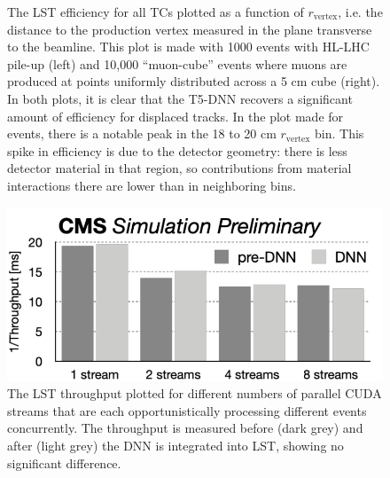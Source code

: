 \begin{figure}[!htb]
    \centering
    \qquad
    \caption{
        The LST efficiency for all TCs plotted as a function of $r_\text{vertex}$, i.e. the distance to the production vertex measured in the plane transverse to the beamline.
        This plot is made with 1000 \ttbar events with HL-LHC pile-up (left) and 10,000 ``muon-cube'' events where muons are produced at points uniformly distributed across a 5 cm cube (right).
        In both plots, it is clear that the T5-DNN recovers a significant amount of efficiency for displaced tracks.
        In the plot made for \ttbar events, there is a notable peak in the 18 to 20 cm $r_\text{vertex}$ bin.
        This spike in efficiency is due to the detector geometry: there is less detector material in that region, so contributions from material interactions there are lower than in neighboring bins.
    }
    \label{fig:t5dnn_dis}
\end{figure}

\begin{figure}[!htb]
    \centering
    \includegraphics[width=0.75\linewidth]{fig/lst/throughput_vs_streams.pdf}
    \caption{
        The LST throughput plotted for different numbers of parallel CUDA streams that are each opportunistically processing different events concurrently. 
        The throughput is measured before (dark grey) and after (light grey) the DNN is integrated into LST, showing no significant difference.
    }
    \label{fig:streams-vs-throughput}
\end{figure}

